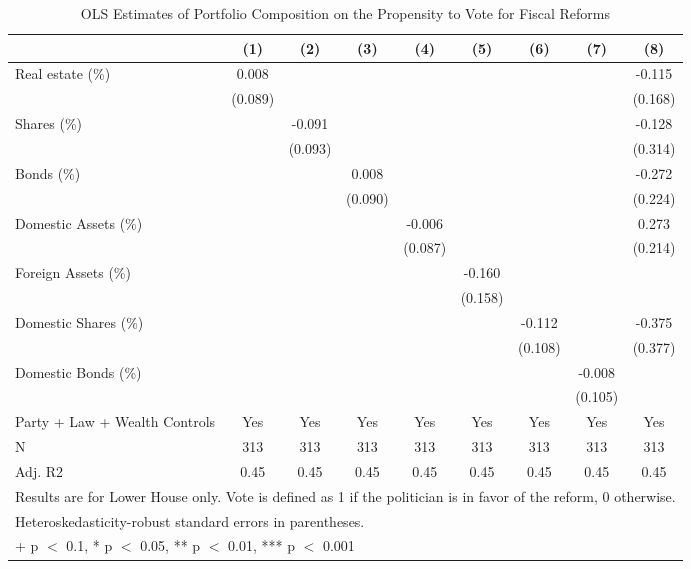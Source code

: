 \begin{table}

\caption{\label{tab:secondorder}OLS Estimates of Portfolio Composition on the Propensity to Vote for Fiscal Reforms}
\centering
\begin{tabular}[t]{lcccccccc}
\toprule
  & (1) & (2) & (3) & (4) & (5) & (6) & (7) & (8)\\
\midrule
Real estate (\%) & 0.008 &  &  &  &  &  &  & -0.115\\
 & (0.089) &  &  &  &  &  &  & (0.168)\\
Shares (\%) &  & -0.091 &  &  &  &  &  & -0.128\\
 &  & (0.093) &  &  &  &  &  & (0.314)\\
Bonds (\%) &  &  & 0.008 &  &  &  &  & -0.272\\
 &  &  & (0.090) &  &  &  &  & (0.224)\\
Domestic Assets (\%) &  &  &  & -0.006 &  &  &  & 0.273\\
 &  &  &  & (0.087) &  &  &  & (0.214)\\
Foreign Assets (\%) &  &  &  &  & -0.160 &  &  & \\
 &  &  &  &  & (0.158) &  &  & \\
Domestic Shares (\%) &  &  &  &  &  & -0.112 &  & -0.375\\
 &  &  &  &  &  & (0.108) &  & (0.377)\\
Domestic Bonds (\%) &  &  &  &  &  &  & -0.008 & \\
 &  &  &  &  &  &  & (0.105) & \\
\midrule
Party + Law + Wealth Controls & Yes & Yes & Yes & Yes & Yes & Yes & Yes & Yes\\
N & 313 & 313 & 313 & 313 & 313 & 313 & 313 & 313\\
Adj. R2 & 0.45 & 0.45 & 0.45 & 0.45 & 0.45 & 0.45 & 0.45 & 0.45\\
\bottomrule
\multicolumn{9}{l}{\rule{0pt}{1em}Results are for Lower House only. Vote is defined as 1 if the politician is in favor of the reform, 0 otherwise.}\\
\multicolumn{9}{l}{\rule{0pt}{1em}Heteroskedasticity-robust standard errors in parentheses.}\\
\multicolumn{9}{l}{\rule{0pt}{1em}+ p $<$ 0.1, * p $<$ 0.05, ** p $<$ 0.01, *** p $<$ 0.001}\\
\end{tabular}
\end{table}
